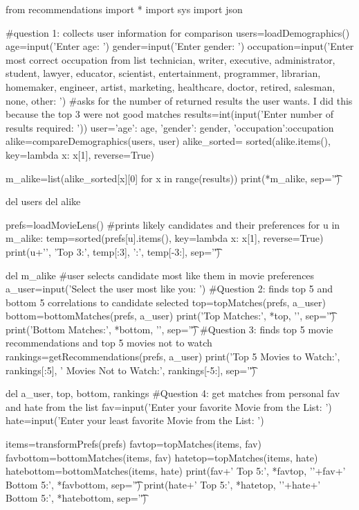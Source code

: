 \documentclass[12pt, letterpaper]{article}
\begin{document}
\begin{MyPython}[caption=Movie\textunderscore Lens.py, label=lst:MovieLenspy]
from recommendations import *
import sys
import json

#question 1: collects user information for comparison
users=loadDemographics()
age=input('Enter age: ')
gender=input('Enter gender: ')
occupation=input('Enter most correct occupation from list {technician, writer, executive, administrator, student, lawyer, educator, scientist, entertainment, programmer, librarian, homemaker, engineer, artist, marketing, healthcare, doctor, retired, salesman, none, other}: ')
#asks for the number of returned results the user wants. I did this because the top 3 were not good matches
results=int(input('Enter number of results required: '))
user={'age': age, 'gender': gender, 'occupation':occupation}
alike=compareDemographics(users, user)
alike_sorted= sorted(alike.items(), key=lambda x: x[1], reverse=True)

m_alike=list(alike_sorted[x][0] for x in range(results))
print(*m_alike, sep='\t')

del users
del alike

prefs=loadMovieLens()
#prints likely candidates and their preferences
for u in m_alike:
    temp=sorted(prefs[u].items(), key=lambda x: x[1], reverse=True)
    print(u+'\n', 'Top 3:\n', temp[:3], '\n{}:\n', temp[-3:], sep='\t')

del m_alike
#user selects candidate most like them in movie preferences
a_user=input('Select the user most like you: ')
#Question 2: finds top 5 and bottom 5 correlations to candidate selected 
top=topMatches(prefs, a_user)
bottom=bottomMatches(prefs, a_user)
print('Top Matches:\n', *top, '\n', sep='\t')
print('Bottom Matches:\n', *bottom, '\n', sep='\t')
#Question 3: finds top 5 movie recommendations and top 5 movies not to watch
rankings=getRecommendations(prefs, a_user)
print('Top 5 Movies to Watch:\n', rankings[:5], ' Movies Not to Watch:\n', rankings[-5:], sep='\t')

del a_user, top, bottom, rankings
#Question 4: get matches from personal fav and hate from the list
fav=input('Enter your favorite Movie from the List: ')
hate=input('Enter your least favorite Movie from the List: ')

items=transformPrefs(prefs)
favtop=topMatches(items, fav)
favbottom=bottomMatches(items, fav)
hatetop=topMatches(items, hate)
hatebottom=bottomMatches(items, hate)
print(fav+' Top 5:\n', *favtop, '\n'+fav+' Bottom 5:\n', *favbottom, sep='\t')
print(hate+' Top 5:\n', *hatetop, '\n'+hate+' Bottom 5:\n', *hatebottom, sep='\t')
\end{MyPython}
\end{document}
